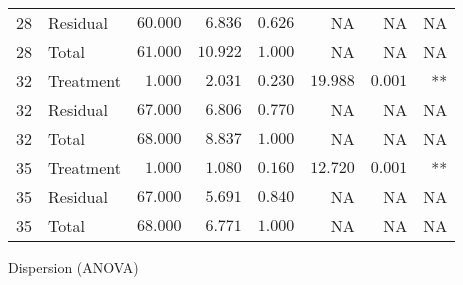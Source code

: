 \documentclass[
]{article}
\begin{document}
\begin{longtable}{rlrrrrrr}
28 & Residual & $60.000$ & $6.836$ & $0.626$ & NA & NA & NA \\ 
28 & Total & $61.000$ & $10.922$ & $1.000$ & NA & NA & NA \\ 
32 & Treatment & $1.000$ & $2.031$ & $0.230$ & $19.988$ & $0.001$ & ** \\ 
32 & Residual & $67.000$ & $6.806$ & $0.770$ & NA & NA & NA \\ 
32 & Total & $68.000$ & $8.837$ & $1.000$ & NA & NA & NA \\ 
35 & Treatment & $1.000$ & $1.080$ & $0.160$ & $12.720$ & $0.001$ & ** \\ 
35 & Residual & $67.000$ & $5.691$ & $0.840$ & NA & NA & NA \\ 
35 & Total & $68.000$ & $6.771$ & $1.000$ & NA & NA & NA \\ 
\bottomrule
\end{longtable}

Dispersion (ANOVA)
\end{document}
